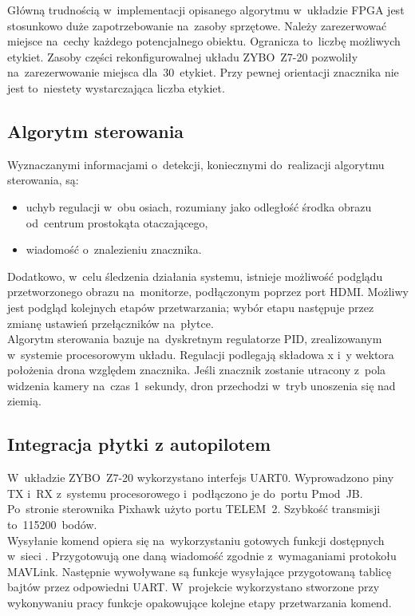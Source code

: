 Główną trudnością w~implementacji opisanego algorytmu w~układzie FPGA jest stosunkowo duże zapotrzebowanie na~zasoby sprzętowe. 
Należy zarezerwować miejsce na~cechy każdego potencjalnego obiektu. 
Ogranicza to~liczbę możliwych etykiet. 
Zasoby części rekonfigurowalnej układu ZYBO~Z7-20 pozwoliły na~zarezerwowanie miejsca dla~30~etykiet. Przy pewnej orientacji znacznika nie jest to~niestety wystarczająca liczba etykiet.
\subsection{Algorytm sterowania}
\label{sec:algorytm_sterowania}
Wyznaczanymi informacjami o~detekcji, koniecznymi do~realizacji algorytmu sterowania, są:
\begin{itemize}
	\item uchyb regulacji w~obu osiach, rozumiany jako odległość środka obrazu od~centrum prostokąta otaczającego,
	\item wiadomość o~znalezieniu znacznika.
\end{itemize}
Dodatkowo, w~celu śledzenia działania systemu, istnieje możliwość podglądu przetworzonego obrazu na~monitorze, podłączonym poprzez port HDMI. Możliwy jest podgląd kolejnych etapów przetwarzania; wybór etapu następuje przez zmianę ustawień przełączników na~płytce.\\
Algorytm sterowania bazuje na~dyskretnym regulatorze PID, zrealizowanym w~systemie procesorowym układu. Regulacji podlegają składowa x i~y wektora położenia drona względem znacznika. Jeśli znacznik zostanie utracony z~pola widzenia kamery na~czas 1~sekundy, dron przechodzi w~tryb unoszenia się nad ziemią.  
\subsection{Integracja płytki z autopilotem}
\label{sec:integracja_plytka_autopilot}
W~układzie ZYBO~Z7-20 wykorzystano interfejs UART0. Wyprowadzono piny TX i~RX z~systemu procesorowego i~podłączono je do~portu Pmod~JB. Po~stronie sterownika Pixhawk użyto portu TELEM~2. Szybkość transmisji to~115200~bodów.\\
Wysyłanie komend opiera się na~wykorzystaniu gotowych funkcji dostępnych w~sieci \cite{github_mavlink}. Przygotowują one daną wiadomość zgodnie z~wymaganiami protokołu MAVLink. Następnie wywoływane są funkcje wysyłające przygotowaną tablicę bajtów przez odpowiedni UART. W~projekcie wykorzystano stworzone przy wykonywaniu pracy \cite{mgr} funkcje opakowujące kolejne etapy przetwarzania komend.
